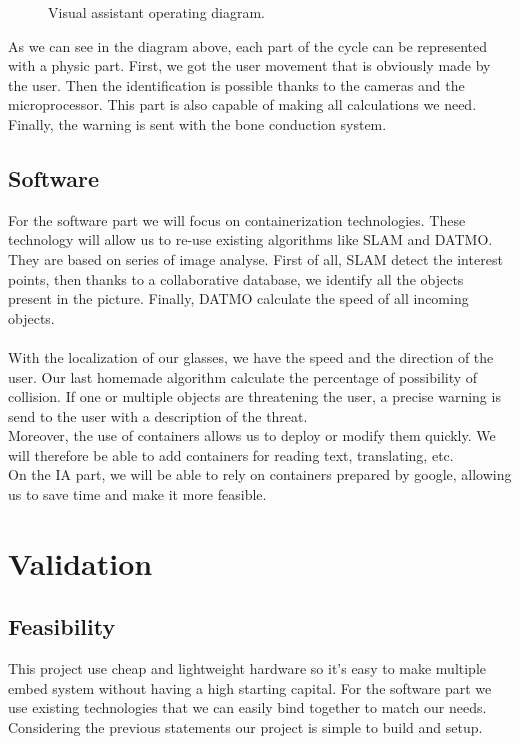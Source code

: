\documentclass[conference,compsoc]{IEEEtran}
\begin{document}
\begin{figure}[h]
\centering
{}
\caption{Visual assistant operating diagram.}
\end{figure}

As we can see in the diagram above, each part of the cycle can be represented with a physic part. First, we got the user movement that is obviously made by the user. Then the identification is possible thanks to the cameras and the microprocessor. This part is also capable of making all calculations we need. Finally, the warning is sent with the bone conduction system.

\subsection{Software}
For the software part we will focus on containerization technologies. These technology will allow us to re-use existing algorithms like SLAM and DATMO. They are based on series of image analyse. First of all, SLAM detect the interest points, then thanks to a collaborative database, we identify all the objects present in the picture. Finally, DATMO calculate the speed of all incoming objects.
\\
\\
With the localization of our glasses, we have the speed and the direction of the user. Our last homemade algorithm calculate the percentage of possibility of collision. If one or multiple objects are threatening the user, a precise warning is send to the user with a description of the threat.  
\\
Moreover, the use of containers allows us to deploy or modify them quickly.
We will therefore be able to add containers for reading text, translating, etc.
\\
On the IA part, we will be able to rely on containers prepared by google, allowing us to save time and make it more feasible.

\section{Validation}
\subsection{Feasibility}
This project use cheap and lightweight hardware so it's easy to make multiple embed system without having a high starting capital. For the software part we use existing technologies that we can easily bind together to match our needs. Considering the previous statements our project is simple to build and setup.
\end{document}
